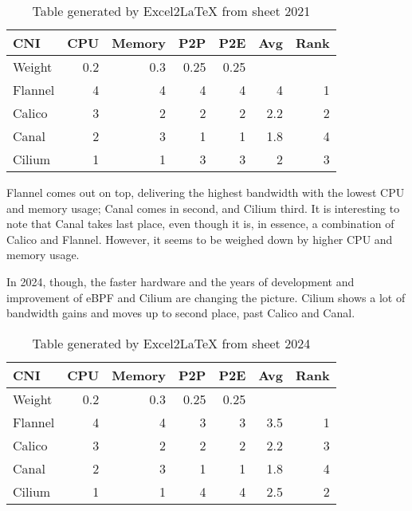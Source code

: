 \begin{table}[H]
  \caption{Table generated by Excel2LaTeX from sheet 2021}
    \begin{tabular}{|l | r | r | r | r| r | r |}
    \hline
    CNI   & CPU & Memory & P2P & P2E & Avg & Rank \\
    \hline\hline
    Weight & 0.2   & 0.3   & 0.25  & 0.25  &       &  \\
    \hline
    Flannel & 4     & 4     & 4     & 4     & 4     & 1 \\
    \hline
    Calico & 3     & 2     & 2     & 2     & 2.2   & 2 \\
    \hline
    Canal & 2     & 3     & 1     & 1     & 1.8   & 4 \\
    \hline
    Cilium & 1     & 1     & 3     & 3     & 2     & 3 \\
    \hline
    \end{tabular}%
  \label{tab:e2l-2021}%
\end{table}%

Flannel comes out on top, delivering the highest bandwidth with the lowest CPU and memory usage; Canal comes in second, and Cilium third. It is interesting to note that Canal takes last place, even though it is, in essence, a combination of Calico and Flannel. However, it seems to be weighed down by higher CPU and memory usage. 

In 2024, though, the faster hardware and the years of development and improvement of eBPF and Cilium are changing the picture. Cilium shows a lot of bandwidth gains and moves up to second place, past Calico and Canal.

\begin{table}[htbp]
  \caption{Table generated by Excel2LaTeX from sheet 2024}
    \begin{tabular}{|l | r | r | r | r| r | r |}
    \hline
    CNI   & CPU & Memory & P2P & P2E & Avg & Rank \\
    \hline\hline
    Weight & 0.2   & 0.3   & 0.25  & 0.25  &       &  \\
    \hline
    Flannel & 4     & 4     & 3     & 3     & 3.5   & 1 \\
    \hline
    Calico & 3     & 2     & 2     & 2     & 2.2   & 3 \\
    \hline
    Canal & 2     & 3     & 1     & 1     & 1.8   & 4 \\
    \hline
    Cilium & 1     & 1     & 4     & 4     & 2.5   & 2 \\
    \hline
    \end{tabular}%
  \label{tab:e2l-2024}%
\end{table}%

